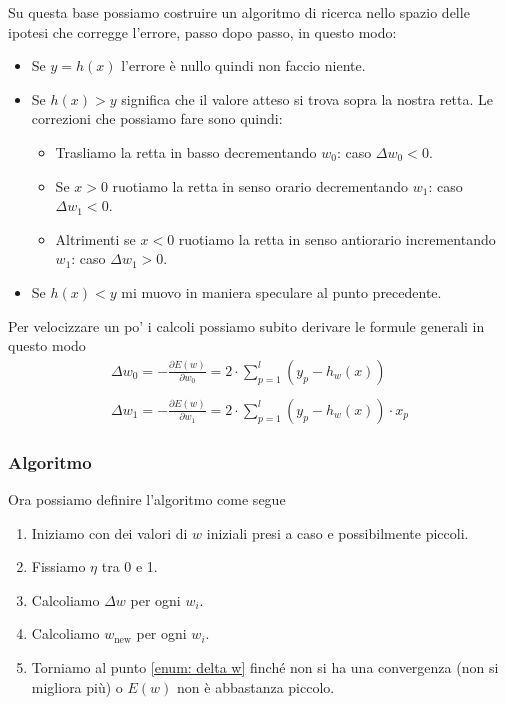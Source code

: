 Su questa base possiamo costruire un algoritmo di ricerca nello spazio delle ipotesi che corregge l'errore, passo dopo passo,
in questo modo:
\begin{itemize}
	\item Se $y = h(x)$ l'errore \`e nullo quindi non faccio niente.
	\item Se $h(x) > y$ significa che il valore atteso si trova sopra la nostra retta. Le correzioni che possiamo fare
	      sono quindi:
	      \begin{itemize}
		      \item Trasliamo la retta in basso decrementando $w_0$: caso $\Delta w_0 < 0$.
		      \item Se $x > 0$ ruotiamo la retta in senso orario decrementando $w_1$: caso $\Delta w_1 < 0$.
		      \item Altrimenti se $x < 0$ ruotiamo la retta in senso antiorario incrementando $w_1$: caso $\Delta w_1 > 0$.
	      \end{itemize}
	\item Se $h(x) < y$ mi muovo in maniera speculare al punto precedente.
\end{itemize}
Per velocizzare un po' i calcoli possiamo subito derivare le formule generali in questo modo
\begin{gather*}
	\Delta w_0 = -\frac{\partial E(w)}{\partial w_0} = 2 \cdot \sum_{p=1}^l (y_p - h_w(x)) \\
	\\
	\Delta w_1 = -\frac{\partial E(w)}{\partial w_1} = 2 \cdot \sum_{p=1}^l (y_p - h_w(x)) \cdot x_p
\end{gather*}

\subsubsection{Algoritmo}
Ora possiamo definire l'algoritmo come segue
\begin{enumerate}
	\item Iniziamo con dei valori di $w$ iniziali presi a caso e possibilmente piccoli.
	\item Fissiamo $\eta$ tra 0 e 1.
	\item \label{enum: delta w} Calcoliamo $\Delta w$ per ogni $w_i$.
	\item Calcoliamo $w_\text{new}$ per ogni $w_i$.
	\item Torniamo al punto \ref{enum: delta w} finch\'e non si ha una convergenza (non si migliora pi\`u) o
	      $E(w)$ non \`e abbastanza piccolo.
\end{enumerate}

